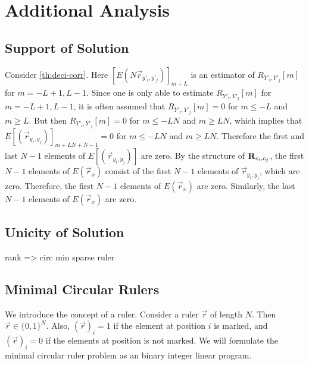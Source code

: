 \documentclass[a4paper, openany, oneside]{memoir}
\begin{document}
\section{Additional Analysis}

\subsection{Support of Solution}
Consider \cref{th:deci-corr}. Here $[E(N \vec{r}_{y'_i,y'_j})]_{m + L}$ is an estimator of $R_{Y'_i,Y'_j}[m]$ for $m = -L+1,L-1$. Since one is only able to estimate $R_{Y'_i,Y'_j}[m]$ for $m=-L+1,L-1$, it is often assumed that $R_{Y'_i,Y'_j}[m]=0$ for $m \le -L$ and $m \ge L$. But then $R_{Y'_i,Y'_j}[m]=0$ for $m \le -LN$ and $m \ge LN$, which implies that $E[(\vec{r}_{y_i,y_j})]_{m+LN + N-1}=0$ for $m \le -LN$ and $m \ge LN$. Therefore the first and last $N-1$ elements of $E[(\vec{r}_{y_i,y_j})]$ are zero. By the structure of $\boldsymbol{\mathbf{R}}_{c_i,c_j}$, the first $N-1$ elements of $E(\vec{r}_x)$ consist of the first $N-1$ elements of $\vec{r}_{y_i,y_j}$, which are zero. Therefore, the first $N-1$ elements of $E(\vec{r}_x)$ are zero. Similarly, the last $N-1$ elements of $E(\vec{r}_x)$ are zero.

\subsection{Unicity of Solution}
rank => circ min sparse ruler

\subsection{Minimal Circular Rulers}
We introduce the concept of a ruler. Consider a ruler $\vec{r}$ of length $N$. Then $\vec{r} \in \{0,1\}^N$. Also, $(\vec{r})_i = 1$ if the element at position $i$ is marked, and $(\vec{r})_i = 0$ if the elements at position is not marked. We will formulate the minimal circular ruler problem as an binary integer linear program.
\end{document}
